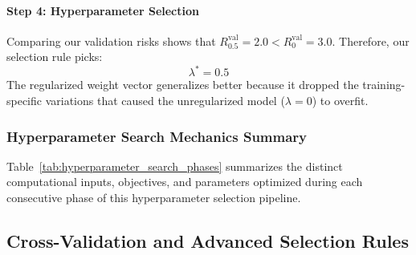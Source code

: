\documentclass{article}
\begin{document}
\paragraph{Step 4: Hyperparameter Selection}
Comparing our validation risks shows that $R^{\text{val}}_{0.5} = 2.0 < R^{\text{val}}_0 = 3.0$. Therefore, our selection rule picks:
\begin{equation}
\lambda^* = 0.5
\end{equation}
The regularized weight vector generalizes better because it dropped the training-specific variations that caused the unregularized model ($\lambda=0$) to overfit.

\subsubsection{Hyperparameter Search Mechanics Summary}
Table~\ref{tab:hyperparameter_search_phases} summarizes the distinct computational inputs, objectives, and parameters optimized during each consecutive phase of this hyperparameter selection pipeline.

\begin{table}[htbp]
\centering
\small
\renewcommand{\arraystretch}{1.3}
\caption{Parameter vs. Hyperparameter Optimization Phases}
\label{tab:hyperparameter_search_phases}
\end{table}

\subsection{Cross-Validation and Advanced Selection Rules}
\end{document}
